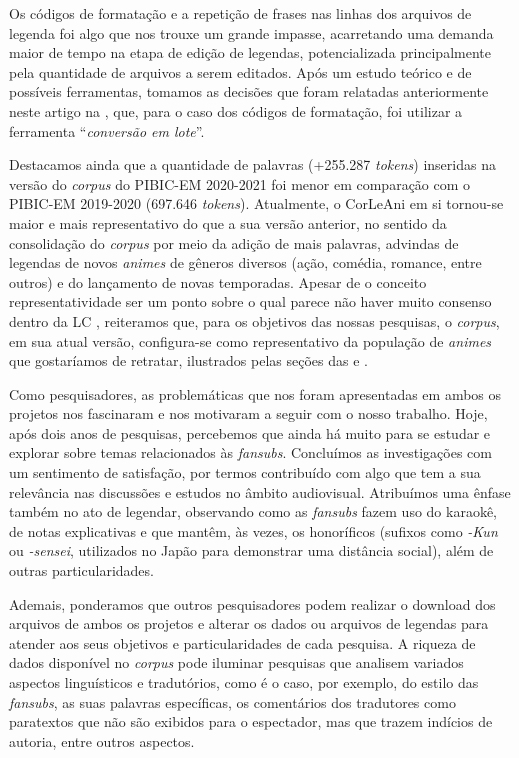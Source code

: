 \documentclass[portuguese]{textolivre}
\begin{document}
Os códigos de formatação e a repetição de frases nas linhas dos arquivos de legenda foi algo que nos trouxe um grande impasse, acarretando uma demanda maior de tempo na etapa de edição de legendas, potencializada principalmente pela quantidade de arquivos a serem editados. Após um estudo teórico e de possíveis ferramentas, tomamos as decisões que foram relatadas anteriormente neste artigo na , que, para o caso dos códigos de formatação, foi utilizar a ferramenta “\textit{conversão em lote}”.

Destacamos ainda que a quantidade de palavras (+255.287 \textit{tokens}) inseridas na versão do \textit{corpus} do PIBIC-EM 2020-2021 foi menor em comparação com o PIBIC-EM 2019-2020 (697.646 \textit{tokens}). Atualmente, o CorLeAni em si tornou-se maior e mais representativo do que a sua versão anterior, no sentido da consolidação do \textit{corpus} por meio da adição de mais palavras, advindas de legendas de novos \textit{animes} de gêneros diversos (ação, comédia, romance, entre outros) e do lançamento de novas temporadas. Apesar de o conceito representatividade ser um ponto sobre o qual parece não haver muito consenso dentro da LC \cite{sardinha_linguistica_2004}, reiteramos que, para os objetivos das nossas pesquisas, o \textit{corpus}, em sua atual versão, configura-se como representativo da população de \textit{animes} que gostaríamos de retratar, ilustrados pelas seções das  e .

Como pesquisadores, as problemáticas que nos foram apresentadas em ambos os projetos nos fascinaram e nos motivaram a seguir com o nosso trabalho. Hoje, após dois anos de pesquisas, percebemos que ainda há muito para se estudar e explorar sobre temas relacionados às \textit{fansubs}. Concluímos as investigações com um sentimento de satisfação, por termos contribuído com algo que tem a sua relevância nas discussões e estudos no âmbito audiovisual. Atribuímos uma ênfase também no ato de legendar, observando como as \textit{fansubs} fazem uso do karaokê, de notas explicativas e que mantêm, às vezes, os honoríficos (sufixos como \textit{-Kun} ou \textit{-sensei}, utilizados no Japão para demonstrar uma distância social), além de outras particularidades.

Ademais, ponderamos que outros pesquisadores podem realizar o download dos arquivos de ambos os projetos e alterar os dados ou arquivos de legendas para atender aos seus objetivos e particularidades de cada pesquisa. A riqueza de dados disponível no \textit{corpus} pode iluminar pesquisas que analisem variados aspectos linguísticos e tradutórios, como é o caso, por exemplo, do estilo das \textit{fansubs}, as suas palavras específicas, os comentários dos tradutores como paratextos que não são exibidos para o espectador, mas que trazem indícios de autoria, entre outros aspectos.
\end{document}
